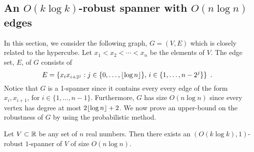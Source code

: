 \documentclass{patmorin}
\begin{document}
%

\subsection{An $O(k\log k)$-robust spanner with $O(n\log n)$ edges}

In this section, we consider the following graph, $G=(V,E)$ which is
closely related to the hypercube.  Let $x_1<x_2<\cdots<x_n$ be the
elements of $V$. The edge set, $E$, of $G$ consists of
\[
    E = \{x_ix_{i+2^j} : j\in\{0,\ldots,{\lfloor \log n \rfloor}\},\, i\in\{1,\ldots,n-2^j\} \} \enspace .
\] 
Notice that $G$ is a 1-spanner since it contains every every edge of the
form $x_i,x_{i+1}$, for $i\in\{1,\ldots,n-1\}$. Furthermore, $G$ has size
$O(n\log n)$ since every vertex has degree at most $2{\lfloor \log n \rfloor}+2$.
We now prove an upper-bound on the robustness of $G$ by using the
probabilistic method.

\begin{thm}
Let $V\subset \mathbb{R}$ be any set of $n$ real numbers.  Then there exists an
$(O(k\log k),1)$-robust $1$-spanner of $V$ of size $O(n\log n)$.
\end{thm}
\end{document}
